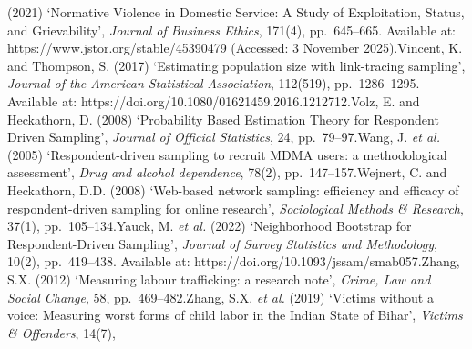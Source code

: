 \documentclass[
  12pt,
  letterpaper,
  DIV=11,
  numbers=noendperiod]{scrartcl}
\begin{document}
{{(2021) `Normative Violence in Domestic Service: A Study of Exploitation,
Status, and Grievability', \emph{Journal of Business Ethics}, 171(4),
pp.~645--665. Available at: https://www.jstor.org/stable/45390479
(Accessed: 3 November 2025).Vincent, K. and Thompson, S. (2017)
`Estimating population size with link-tracing sampling', \emph{Journal
of the American Statistical Association}, 112(519), pp.~1286--1295.
Available at: https://doi.org/10.1080/01621459.2016.1212712.Volz, E. and
Heckathorn, D. (2008) `Probability Based Estimation Theory for
Respondent Driven Sampling', \emph{Journal of Official Statistics}, 24,
pp.~79--97.Wang, J. \emph{et al.} (2005) `Respondent-driven sampling to
recruit MDMA users: a methodological assessment', \emph{Drug and alcohol
dependence}, 78(2), pp.~147--157.Wejnert, C. and Heckathorn, D.D. (2008)
`Web-based network sampling: efficiency and efficacy of
respondent-driven sampling for online research', \emph{Sociological
Methods \& Research}, 37(1), pp.~105--134.Yauck, M. \emph{et al.} (2022)
`Neighborhood Bootstrap for Respondent-Driven Sampling', \emph{Journal
of Survey Statistics and Methodology}, 10(2), pp.~419--438. Available
at: https://doi.org/10.1093/jssam/smab057.Zhang, S.X. (2012) `Measuring
labour trafficking: a research note', \emph{Crime, Law and Social
Change}, 58, pp.~469--482.Zhang, S.X. \emph{et al.} (2019) `Victims
without a voice: Measuring worst forms of child labor in the Indian
State of Bihar', \emph{Victims \& Offenders}, 14(7),
}}
\end{document}

